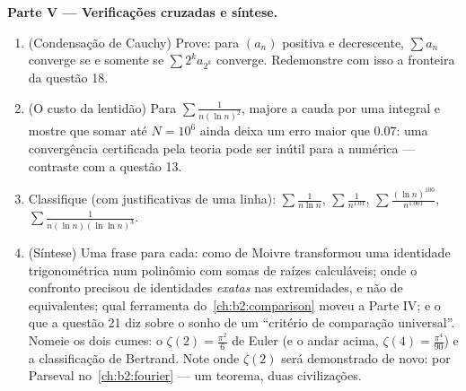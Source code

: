 \begin{problem}[{Problema de fim de semana --- $\zeta(2) = \pi^2/6$ e o
panorama de Bertrand}]
\medskip
\noindent\textbf{Parte V --- Verificações cruzadas e síntese.}
\begin{enumerate}[resume]
  \item (Condensação de Cauchy) Prove: para $(a_n)$ positiva e
        decrescente, $\sum a_n$ converge se e somente se $\sum 2^k a_{2^k}$
        converge. Redemonstre com isso a fronteira da questão 18.
  \item (O custo da lentidão) Para $\sum\frac1{n(\ln n)^2}$,
        majore a cauda por uma integral e mostre que somar até
        $N = 10^6$ ainda deixa um erro maior que
        $0.07$: uma convergência certificada pela teoria pode ser inútil
        para a numérica --- contraste com a questão 13.
  \item Classifique (com justificativas de uma linha):
        $\sum\frac1{n\ln n}$, $\sum\frac1{n^{1.01}}$,
        $\sum\frac{(\ln n)^{100}}{n^{1.001}}$,
        $\sum\frac1{n(\ln n)(\ln\ln n)^{3}}$.
  \item (Síntese) Uma frase para cada: como de Moivre transformou uma
        identidade trigonométrica num polinômio com somas de raízes
        calculáveis; onde o confronto precisou de identidades \emph{exatas}
        nas extremidades, e não de equivalentes; qual ferramenta
        do~\cref{ch:b2:comparison} moveu a Parte IV; e o que a
        questão 21 diz sobre o sonho de um ``critério de comparação
        universal''. Nomeie os dois cumes: o $\zeta(2) = \frac{\pi^2}6$
        de Euler (e o andar acima, $\zeta(4) = \frac{\pi^4}{90}$) e a
        classificação de Bertrand. Note onde $\zeta(2)$ será demonstrado
        de novo: por Parseval no~\cref{ch:b2:fourier} --- um
        teorema, duas civilizações.
\end{enumerate}
\end{problem}
